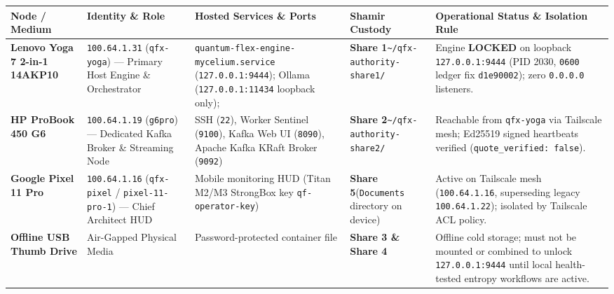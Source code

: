 \documentclass[10pt,letterpaper]{article}
\begin{document}
\vspace{6pt}\noindent\begin{minipage}{\textwidth}
\centering
{}
\vspace{2pt}
\footnotesize
\begin{tabularx}{\textwidth}{L{2.5cm} L{2.6cm} L{4.2cm} L{3.1cm} Y}
\toprule
\textbf{Node / Medium} & \textbf{Identity \& Role} & \textbf{Hosted Services \& Ports} & \textbf{Shamir Custody} & \textbf{Operational Status \& Isolation Rule} \\
\midrule
\textbf{Lenovo Yoga 7 2-in-1 14AKP10} & \texttt{100.64.1.31} (\texttt{qfx-yoga}) --- Primary Host Engine \& Orchestrator & \texttt{quantum-flex-engine-}\newline\texttt{mycelium.service} (\texttt{127.0.0.1:9444}); Ollama (\texttt{127.0.0.1:11434} loopback only);  & \textbf{Share 1}\newline\texttt{\textasciitilde/qfx-authority-}\newline\texttt{share1/} & Engine \textbf{LOCKED} on loopback \texttt{127.0.0.1:9444} (PID 2030, \texttt{0600} ledger fix \texttt{d1e90002}); zero \texttt{0.0.0.0} listeners. \\
\textbf{HP ProBook 450 G6} & \texttt{100.64.1.19} (\texttt{g6pro}) --- Dedicated Kafka Broker \& Streaming Node & SSH (\texttt{22}), Worker Sentinel (\texttt{9100}), Kafka Web UI (\texttt{8090}), Apache Kafka KRaft Broker (\texttt{9092}) & \textbf{Share 2}\newline\texttt{\textasciitilde/qfx-authority-}\newline\texttt{share2/} & Reachable from \texttt{qfx-yoga} via Tailscale mesh; Ed25519 signed heartbeats verified (\texttt{quote\_verified: false}). \\
\textbf{Google Pixel 11 Pro} & \texttt{100.64.1.16} (\texttt{qfx-pixel} / \texttt{pixel-11-pro-1}) --- Chief Architect HUD & Mobile monitoring HUD (Titan M2/M3 StrongBox key \texttt{qf-operator-key}) & \textbf{Share 5}\newline(\texttt{Documents} directory on device) & Active on Tailscale mesh (\texttt{100.64.1.16}, superseding legacy \texttt{100.64.1.22}); isolated by Tailscale ACL policy. \\
\textbf{Offline USB Thumb Drive} & Air-Gapped Physical Media & Password-protected container file & \textbf{Share 3 \& Share 4} & Offline cold storage; must not be mounted or combined to unlock \texttt{127.0.0.1:9444} until local health-tested entropy workflows are active. \\
\bottomrule
\end{tabularx}
\end{minipage}\vspace{6pt}
\end{document}
